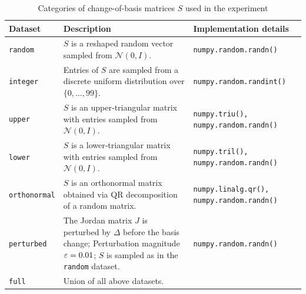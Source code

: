 

\begin{table}[htbp]
\centering
\begin{tabular}{
    l
    >{\RaggedRight\arraybackslash}p{}
    >{\RaggedRight\arraybackslash}p{}
}
\toprule
\textbf{Dataset} & \textbf{Description} & \textbf{Implementation details} \\
\midrule
\texttt{random} &
$S$ is a reshaped random vector sampled from $\mathcal N\left(0,I\right)$. &
\texttt{numpy.random.randn()} \\ \midrule
%
\texttt{integer} &
Entries of $S$ are sampled from a discrete uniform distribution over $\{0, \dots, 99\}$. &
\texttt{numpy.random.randint()} \\\midrule
%
\texttt{upper} &
$S$ is an upper‐triangular matrix with entries sampled from $\mathcal N\left(0,I\right)$. &
\texttt{numpy.triu(), numpy.random.randn()} \\\midrule
%
\texttt{lower} &
$S$ is a lower‐triangular matrix with entries sampled from $\mathcal N\left(0,I\right)$. &
\texttt{numpy.tril(), numpy.random.randn()} \\\midrule
%
\texttt{orthonormal} &
$S$ is an orthonormal matrix obtained via QR decomposition of a random matrix. &
\texttt{numpy.linalg.qr(), numpy.random.randn()} \\\midrule
%
\texttt{perturbed} &
The Jordan matrix $J$ is perturbed by $\Delta$ before the basis change; Perturbation magnitude $\varepsilon=0.01$; $S$ is sampled as in the \texttt{random} dataset. &
\texttt{numpy.random.randn()} \\\midrule
%
\texttt{full} &
Union of all above datasets. &
\\
\bottomrule
\end{tabular}
\caption{Categories of change-of-basis matrices $S$ used in the experiment}
\label{table:change-of-base-types}
\end{table}


%


